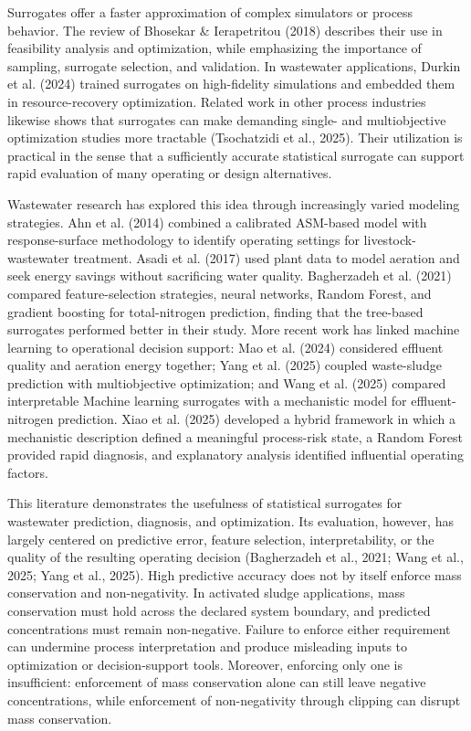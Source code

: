 \documentclass[a4paper,fleqn]{cas-sc}
\begin{document}
Surrogates offer a faster approximation of complex simulators or process behavior. The review of Bhosekar \& Ierapetritou (2018) describes their use in feasibility analysis and optimization, while emphasizing the importance of sampling, surrogate selection, and validation. In wastewater applications, Durkin et al. (2024) trained surrogates on high-fidelity simulations and embedded them in resource-recovery optimization. Related work in other process industries likewise shows that surrogates can make demanding single- and multiobjective optimization studies more tractable (Tsochatzidi et al., 2025). Their utilization is practical in the sense that a sufficiently accurate statistical surrogate can support rapid evaluation of many operating or design alternatives.

Wastewater research has explored this idea through increasingly varied modeling strategies. Ahn et al. (2014) combined a calibrated ASM-based model with response-surface methodology to identify operating settings for livestock-wastewater treatment. Asadi et al. (2017) used plant data to model aeration and seek energy savings without sacrificing water quality. Bagherzadeh et al. (2021) compared feature-selection strategies, neural networks, Random Forest, and gradient boosting for total-nitrogen prediction, finding that the tree-based surrogates performed better in their study. More recent work has linked machine learning to operational decision support: Mao et al. (2024) considered effluent quality and aeration energy together; Yang et al. (2025) coupled waste-sludge prediction with multiobjective optimization; and Wang et al. (2025) compared interpretable Machine learning surrogates with a mechanistic model for effluent-nitrogen prediction. Xiao et al. (2025) developed a hybrid framework in which a mechanistic description defined a meaningful process-risk state, a Random Forest provided rapid diagnosis, and explanatory analysis identified influential operating factors.

This literature demonstrates the usefulness of statistical surrogates for wastewater prediction, diagnosis, and optimization. Its evaluation, however, has largely centered on predictive error, feature selection, interpretability, or the quality of the resulting operating decision (Bagherzadeh et al., 2021; Wang et al., 2025; Yang et al., 2025). High predictive accuracy does not by itself enforce mass conservation and non-negativity. In activated sludge applications, mass conservation must hold across the declared system boundary, and predicted concentrations must remain non-negative. Failure to enforce either requirement can undermine process interpretation and produce misleading inputs to optimization or decision-support tools. Moreover, enforcing only one is insufficient: enforcement of mass conservation alone can still leave negative concentrations, while enforcement of non-negativity through clipping can disrupt mass conservation.
\end{document}
